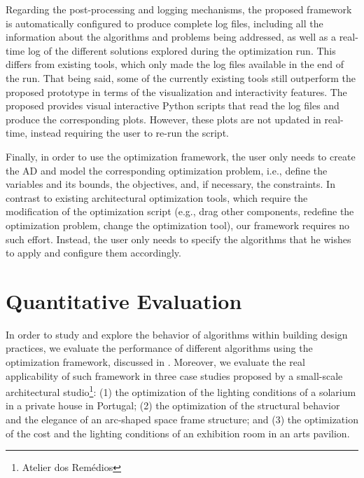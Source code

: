 Regarding the post-processing and logging mechanisms, the proposed framework is automatically configured to produce complete log files, including all the information about the algorithms and problems being addressed, as well as a real-time log of the different solutions explored during the optimization run. This differs from existing tools, which only made the log files available in the end of the run. That being said, some of the currently existing tools still outperform the proposed prototype in terms of the visualization and interactivity features. The proposed provides visual interactive Python scripts that read the log files and produce the corresponding plots. However, these plots are not updated in real-time, instead requiring the user to re-run the script.

Finally, in order to use the optimization framework, the user only needs to create the \ac{AD} and model the corresponding optimization problem, i.e., define the variables and its bounds, the objectives, and, if necessary, the constraints. In contrast to existing architectural optimization tools, which require the modification of the optimization script (e.g., drag other components, redefine the optimization problem, change the optimization tool), our framework requires no such effort. Instead, the user only needs to specify the algorithms that he wishes to apply and configure them accordingly.

\section{Quantitative Evaluation}
\label{sec:quantitative}

In order to study and explore the behavior of algorithms within building design practices, we evaluate the performance of different algorithms using the optimization framework, discussed in . Moreover, we evaluate the real applicability of such framework in three case studies proposed by a small-scale architectural studio\footnote{Atelier dos Remédios}: (1) the optimization of the lighting conditions of a solarium in a private house in Portugal; (2) the optimization of the structural behavior and the elegance of an arc-shaped space frame structure; and (3) the optimization of the cost and the lighting conditions of an exhibition room in an arts pavilion.   

